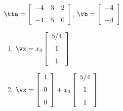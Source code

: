 {$\tta = \left[ \begin {array}{ccc} -4&3&2\\\noalign{\medskip}-4&5&0
\end {array} \right]$, $\vb=\left[ \begin {array}{c} -4\\\noalign{\medskip}-4\end {array}\right]$}
{\begin{enumerate}
\item	 $\vx=x_3\left[ \begin {array}{c} 5/4\\\noalign{\medskip}1\\\noalign{\medskip}1\end {array}
\right]$
\item	 $\vx=\left[ \begin {array}{c} 1\\\noalign{\medskip}0\\\noalign{\medskip}0\end {array} \right]+x_3\left[ \begin {array}{c} 5/4\\\noalign{\medskip}1\\\noalign{\medskip}1\end {array}
\right]$ 
\end{enumerate}
 }







